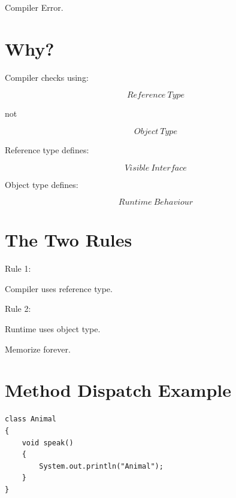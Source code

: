 \documentclass[11pt,a4paper]{book}
\begin{document}

Compiler Error.


\section{Why?}

Compiler checks using:

\[
Reference\ Type
\]

not

\[
Object\ Type
\]


Reference type defines:

\[
Visible\ Interface
\]


Object type defines:

\[
Runtime\ Behaviour
\]


\section{The Two Rules}

Rule 1:

Compiler uses reference type.


Rule 2:

Runtime uses object type.


Memorize forever.


\section{Method Dispatch Example}

\begin{verbatim}
class Animal
{
    void speak()
    {
        System.out.println("Animal");
    }
}
\end{verbatim}

\end{document}
